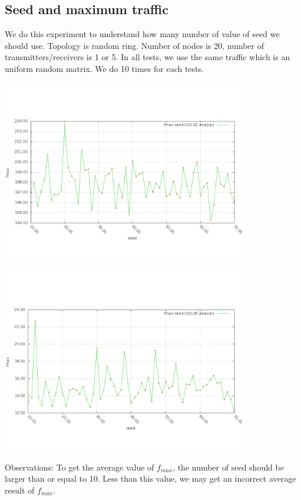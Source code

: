 \documentclass[a4paper]{article}
\begin{document}
  \subsection{Seed and maximum traffic}
    We do this experiment to understand how many number of value of seed we should use. Topology is random ring. Number of nodes is 20, number of transmitters/receivers is 1 or 5. In all tests, we use the same traffic which is an uniform random matrix. We do 10 times for each tests.

    \begin{center}
    \includegraphics[width=0.8\textwidth]{random-ring-results/plot_s_f.png}
    \label{fig:plot-s-f-1}
    \end{center}

    \begin{center}
    \includegraphics[width=0.8\textwidth]{random-ring-results/plot_s_f5.png}
    \label{fig:plot-s-f-5}
    \end{center}
  Observations: To get the average value of $f_{max}$, the number of seed should be larger than  or equal to 10. Less than this value, we may get an incorrect average result of $f_{max}$.
\end{document}
